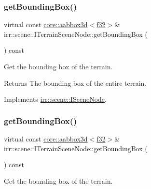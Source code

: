 \subsubsection{\texorpdfstring{get\+Bounding\+Box()}{getBoundingBox()}\hspace{0.1cm}{\footnotesize\ttfamily [1/4]}}
{\footnotesize\ttfamily virtual const \hyperlink{classirr_1_1core_1_1aabbox3d}{core\+::aabbox3d}$<$\hyperlink{namespaceirr_a0277be98d67dc26ff93b1a6a1d086b07}{f32}$>$\& irr\+::scene\+::\+I\+Terrain\+Scene\+Node\+::get\+Bounding\+Box (\begin{DoxyParamCaption}{ }\end{DoxyParamCaption}) const\hspace{0.3cm}{\ttfamily [pure virtual]}}



Get the bounding box of the terrain. 

\begin{DoxyReturn}{Returns}
The bounding box of the entire terrain. 
\end{DoxyReturn}


Implements \hyperlink{classirr_1_1scene_1_1ISceneNode_a223f718fc2f4944b5ad28c592f6cc8c6}{irr\+::scene\+::\+I\+Scene\+Node}.

\mbox{\label{classirr_1_1scene_1_1ITerrainSceneNode_a02a14fe28f5a326fca819c36bee2e92e}} 
\subsubsection{\texorpdfstring{get\+Bounding\+Box()}{getBoundingBox()}\hspace{0.1cm}{\footnotesize\ttfamily [2/4]}}
{\footnotesize\ttfamily virtual const \hyperlink{classirr_1_1core_1_1aabbox3d}{core\+::aabbox3d}$<$\hyperlink{namespaceirr_a0277be98d67dc26ff93b1a6a1d086b07}{f32}$>$\& irr\+::scene\+::\+I\+Terrain\+Scene\+Node\+::get\+Bounding\+Box (\begin{DoxyParamCaption}{ }\end{DoxyParamCaption}) const\hspace{0.3cm}{\ttfamily [pure virtual]}}



Get the bounding box of the terrain. 


